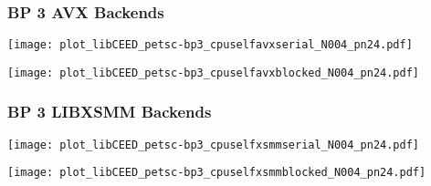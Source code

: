 \documentclass{beamer}
\begin{document}

\begin{frame}
\begin{center}
\frametitle{BP 3 AVX Backends}

\begin{multicols}{2}

\begin{flushleft}
\texttt{[image: plot\_libCEED\_petsc-bp3\_cpuselfavxserial\_N004\_pn24.pdf]}
\end{flushleft}

\begin{flushright}
\texttt{[image: plot\_libCEED\_petsc-bp3\_cpuselfavxblocked\_N004\_pn24.pdf]}
\end{flushright}

\end{multicols}

\end{center}
\end{frame}


\begin{frame}
\begin{center}
\frametitle{BP 3 LIBXSMM Backends}

\begin{multicols}{2}

\begin{flushleft}
\texttt{[image: plot\_libCEED\_petsc-bp3\_cpuselfxsmmserial\_N004\_pn24.pdf]}
\end{flushleft}

\begin{flushright}
\texttt{[image: plot\_libCEED\_petsc-bp3\_cpuselfxsmmblocked\_N004\_pn24.pdf]}
\end{flushright}

\end{multicols}

\end{center}
\end{frame}


\end{document}
